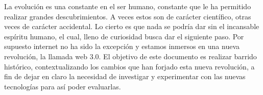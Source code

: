  La evolución es una constante en el ser humano, constante que le ha permitido realizar grandes descubrimientos. A veces
 estos son de carácter científico, otras veces de carácter accidental. Lo cierto es que nada se podría dar sin 
 el incansable espíritu humano, el cual, lleno de curiosidad busca dar el siguiente paso. Por supuesto internet 
 no ha sido la excepción y estamos inmersos en una nueva revolución, la llamada web 3.0. El objetivo de este 
 documento es realizar barrido histórico, contextualizando los cambios que han forjado esta nueva revolución, a fin
 de dejar en claro la necesidad de investigar y experimentar con las nuevas tecnologías para así poder evaluarlas.